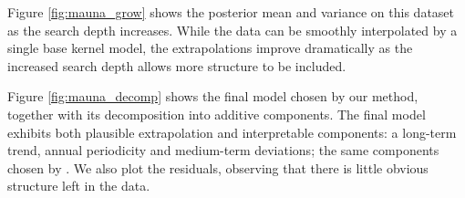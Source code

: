 Figure \ref{fig:mauna_grow} shows the posterior mean and variance on this dataset as the search depth increases.
While the data can be smoothly interpolated by a single base kernel model, the extrapolations improve dramatically as the increased search depth allows more structure to be included.

Figure \ref{fig:mauna_decomp} shows the 
final model chosen by our method, together with its decomposition into additive components.
The final model exhibits both plausible extrapolation and interpretable components: a long-term trend, annual periodicity and medium-term deviations; the same components chosen by \citet{rasmussen38gaussian}.
We also plot the residuals, observing that there is little obvious structure left in the data.  
%
%








